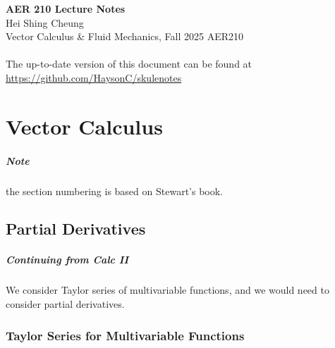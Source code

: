 \documentclass[11pt]{report}
\begin{document}
\thispagestyle{empty}
{\LARGE \bf AER 210 Lecture Notes}\\
{\large Hei Shing Cheung}\\
Vector Calculus \& Fluid Mechanics, Fall 2025 \hfill AER210\\
\\
The up-to-date version of this document can be found at \url{https://github.com/HaysonC/skulenotes}\\

\chapter{Vector Calculus}

\setcounter{section}{13}
\paragraph{Note} the section numbering is based on Stewart's book.

\section{Partial Derivatives}
\paragraph{Continuing from Calc II} We consider Taylor series of multivariable functions, and we would need to consider partial derivatives.

\subsection{Taylor Series for Multivariable Functions}
\end{document}

